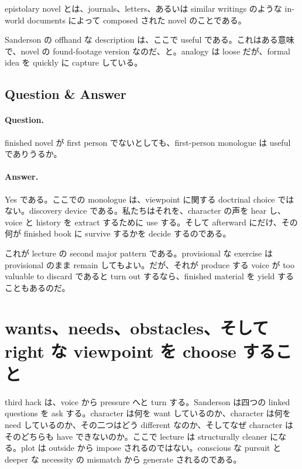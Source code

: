 \begin{definition}
epistolary novel とは、journals、letters、あるいは similar writings のような in-world documents によって composed された novel のことである。
\end{definition}

Sanderson の offhand な description は、ここで useful である。これはある意味で、novel の found-footage version なのだ、と。analogy は loose だが、formal idea を quickly に capture している。

\subsection{Question \& Answer}

\paragraph{Question.} finished novel が first person でないとしても、first-person monologue は useful でありうるか。

\paragraph{Answer.} Yes である。ここでの monologue は、viewpoint に関する doctrinal choice ではない。discovery device である。私たちはそれを、character の声を hear し、voice と history を extract するために use する。そして afterward にだけ、その何が finished book に survive するかを decide するのである。

これが lecture の second major pattern である。provisional な exercise は provisional のまま remain してもよい。だが、それが produce する voice が too valuable to discard であると turn out するなら、finished material を yield することもあるのだ。

\section{wants、needs、obstacles、そして right な viewpoint を choose すること}

third hack は、voice から pressure へと turn する。Sanderson は四つの linked questions を ask する。character は何を want しているのか、character は何を need しているのか、その二つはどう different なのか、そしてなぜ character はそのどちらも have できないのか。ここで lecture は structurally cleaner になる。plot は outside から impose されるのではない。conscious な pursuit と deeper な necessity の mismatch から generate されるのである。

